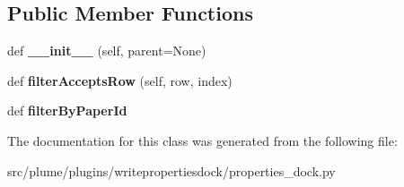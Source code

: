 \subsection*{Public Member Functions}
\begin{DoxyCompactItemize}
\item 
def {\bfseries \+\_\+\+\_\+init\+\_\+\+\_\+} (self, parent=None)\hypertarget{classplume-creator_1_1src_1_1plume_1_1plugins_1_1writepropertiesdock_1_1properties__dock_1_1_table_filter_ad41aa4958f29c33ca58b88505f31f448}{}\label{classplume-creator_1_1src_1_1plume_1_1plugins_1_1writepropertiesdock_1_1properties__dock_1_1_table_filter_ad41aa4958f29c33ca58b88505f31f448}

\item 
def {\bfseries filter\+Accepts\+Row} (self, row, index)\hypertarget{classplume-creator_1_1src_1_1plume_1_1plugins_1_1writepropertiesdock_1_1properties__dock_1_1_table_filter_a27dd3a68c440b59cc66d8f9cfedb6a76}{}\label{classplume-creator_1_1src_1_1plume_1_1plugins_1_1writepropertiesdock_1_1properties__dock_1_1_table_filter_a27dd3a68c440b59cc66d8f9cfedb6a76}

\item 
def {\bfseries filter\+By\+Paper\+Id}\hypertarget{classplume-creator_1_1src_1_1plume_1_1plugins_1_1writepropertiesdock_1_1properties__dock_1_1_table_filter_a90d8631578c3edbfbf36ea5819604079}{}\label{classplume-creator_1_1src_1_1plume_1_1plugins_1_1writepropertiesdock_1_1properties__dock_1_1_table_filter_a90d8631578c3edbfbf36ea5819604079}

\end{DoxyCompactItemize}


The documentation for this class was generated from the following file\+:\begin{DoxyCompactItemize}
\item 
src/plume/plugins/writepropertiesdock/properties\+\_\+dock.\+py\end{DoxyCompactItemize}
